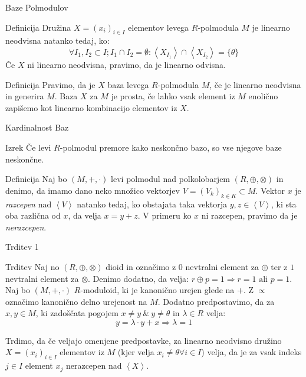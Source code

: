 \documentclass[t, 11pt]{beamer} %
\newcommand{\pojem}[1]{\emph{#1}}
\newcommand{\Gen}[1]{\ensuremath{\left<{#1}\right>}}
\begin{document}
\begin{frame}{Baze Polmodulov}
	\begin{block}{Definicija}
		Družina $X=(x_i)_{i\in I}$ elementov levega $R$-polmodula $M$ je linearno neodvisna natanko tedaj, ko: $$\forall I_1, I_2 \subset I; I_1\cap I_2 =\emptyset: \Gen{X_{I_1}}\cap\Gen{X_{I_2}} = \{\theta\}$$
		Če $X$ ni linearno neodvisna, pravimo, da je linearno odvisna.
	\end{block}	
\begin{block}{Definicija}
			Pravimo, da je $X$ baza levega $R$-polmodula $M$, če je linearno neodvisna in generira $M$. Baza $X$ za $M$ je prosta, če lahko vsak element iz $M$ enolično zapišemo kot linearno kombinacijo elementov iz $X$.
\end{block}

\end{frame}

\begin{frame}{Kardinalnost Baz}
	\begin{block}{Izrek}
		Če levi $R$-polmodul premore kako neskončno bazo, so vse njegove baze neskončne. 
	\end{block}
	\begin{block}{Definicija}
		Naj bo $(M, +,\cdot)$ levi polmodul nad polkolobarjem $(R, \oplus, \otimes)$ in denimo, da imamo dano neko množico vektorjev $V = (V_k)_{k\in K} \subset M$. Vektor $x$ je \pojem{razcepen} nad \Gen{V} natanko tedaj, ko obstajata taka vektorja $y, z\in \Gen{V}$, ki sta oba različna od $x$, da velja $x = y + z$. V primeru ko $x$ ni razcepen, pravimo da je \pojem{nerazcepen}.
	\end{block}
\end{frame}

\begin{frame}{Trditev 1}
	\begin{block}{Trditev}
		Naj no $(R, \oplus, \otimes)$ dioid in označimo z $0$ nevtralni element za $\oplus$ ter z $1$ nevtralni element za $\otimes$. Denimo dodatno, da velja: $r\oplus p = 1 \Rightarrow r = 1 \text{~ali~} p=1$. 
		Naj bo $(M, +, \cdot)$ $R$-moduloid, ki je kanonično urejen glede na $+$. Z $\varpropto$ označimo kanonično delno urejenost na $M$. Dodatno predpostavimo, da za $x, y\in M$, ki zadoščata pogojem $x \neq y ~\&~ y\neq\theta$ in $\lambda\in R$ velja: $$y = \lambda\cdot y + x \Rightarrow \lambda = 1$$
		
		Trdimo, da če veljajo omenjene predpostavke, za linearno neodvisno družino \newline $X = (x_i)_{i\in I}$ elementov iz $M$ (kjer velja $x_i \neq \theta \forall i\in I$) velja, da je za vsak indeks $j\in I$ element $x_j$ nerazcepen nad \Gen{X}.
	\end{block}
\end{frame}
\end{document}
